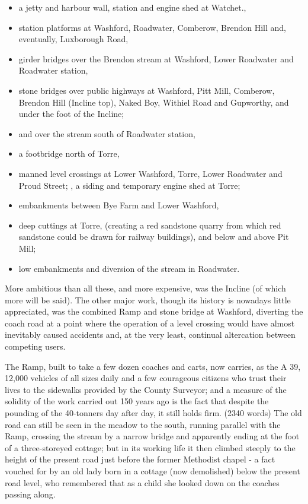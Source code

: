 \documentclass[10pt,a4paper]{article}
\begin{document}
\begin{itemize}
\item a jetty and harbour wall, station and engine shed at Watchet., 
\item station platforms at Washford, Roadwater, Comberow, Brendon Hill  and, eventually, Luxborough Road, 
\item girder bridges over the Brendon stream at Washford, Lower Roadwater and Roadwater station, 
\item stone bridges over public highways at Washford, Pitt Mill, Comberow, Brendon Hill (Incline top), Naked Boy, Withiel Road and Gupworthy, and under the foot of the Incline; 
\item and over the stream south of  Roadwater station, 
\item a footbridge north of Torre,  
\item manned level crossings at Lower Washford, Torre, Lower Roadwater and  Proud Street; , a siding and temporary engine shed at Torre;
\item embankments between Bye Farm and Lower Washford, 
\item deep cuttings at Torre,  (creating a red sandstone quarry from which red sandstone could  be drawn for railway buildings), and below and above Pit Mill;   
\item low embankments and diversion of the stream in Roadwater.
\end{itemize}

More ambitious than all these, and more expensive, was the Incline (of which more will be said).  The other major work, though its history is  nowadays little appreciated, was the combined Ramp and stone bridge at Washford, diverting the coach road at a point where the operation of a  level crossing would have almost inevitably caused accidents and, at the very least, continual altercation between competing users. 

The Ramp, built to take a few dozen coaches and carts, now carries, as the A 39, 12,000 vehicles of all sizes daily and a few courageous citizens who trust their lives to the sidewalks provided by the County Surveyor; and a measure of the solidity of the work carried out 150 years ago is the fact that despite the pounding of the 40-tonners day after day, it still holds firm. (2340 words)  The old road can still be seen in the meadow to the south, running parallel with the Ramp, crossing the stream by a  narrow bridge and apparently ending at the foot of a three-storeyed cottage; but in its working life it then climbed steeply to the height of the present road just before the former Methodist chapel  - a fact vouched for by an old lady born in a cottage (now demolished) below the present road level, who remembered that as a child she looked down on the coaches passing along.
\end{document}
